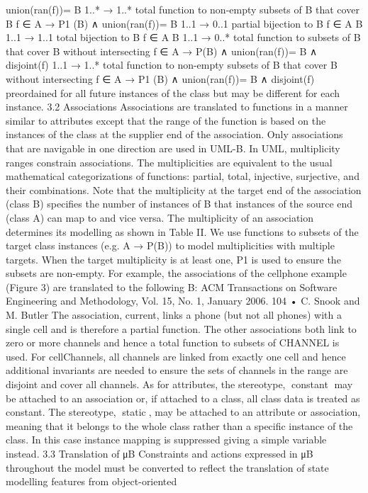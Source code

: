 union(ran(f))= B
1..* → 1..* total function to non-empty subsets of B
that cover B
f ∈ A → P1 (B) ∧
union(ran(f))= B
1..1 → 0..1 partial bijection to B f ∈ A  B
1..1 → 1..1 total bijection to B f ∈ A  B
1..1 → 0..* total function to subsets of B that cover B
without intersecting
f ∈ A → P(B) ∧
union(ran(f))= B ∧
disjoint(f)
1..1 → 1..* total function to non-empty subsets of B
that cover B without intersecting
f ∈ A → P1 (B) ∧
union(ran(f))= B ∧
disjoint(f)
preordained for all future instances of the class but may be different for each
instance.
3.2 Associations
Associations are translated to functions in a manner similar to attributes except that the range of the function is based on the instances of the class at the
supplier end of the association. Only associations that are navigable in one direction are used in UML-B. In UML, multiplicity ranges constrain associations.
The multiplicities are equivalent to the usual mathematical categorizations of
functions: partial, total, injective, surjective, and their combinations. Note that
the multiplicity at the target end of the association (class B) specifies the number of instances of B that instances of the source end (class A) can map to
and vice versa. The multiplicity of an association determines its modelling as
shown in Table II. We use functions to subsets of the target class instances
(e.g. A → P(B)) to model multiplicities with multiple targets. When the target
multiplicity is at least one, P1 is used to ensure the subsets are non-empty.
For example, the associations of the cellphone example (Figure 3) are translated to the following B:
ACM Transactions on Software Engineering and Methodology, Vol. 15, No. 1, January 2006.
104 • C. Snook and M. Butler
The association, current, links a phone (but not all phones) with a single cell
and is therefore a partial function. The other associations both link to zero or
more channels and hence a total function to subsets of CHANNEL is used. For
cellChannels, all channels are linked from exactly one cell and hence additional
invariants are needed to ensure the sets of channels in the range are disjoint
and cover all channels.
As for attributes, the stereotype, constant may be attached to an association or, if attached to a class, all class data is treated as constant. The
stereotype, static, may be attached to an attribute or association, meaning that it belongs to the whole class rather than a specific instance of the
class. In this case instance mapping is suppressed giving a simple variable
instead.
3.3 Translation of μB
Constraints and actions expressed in μB throughout the model must be converted to reflect the translation of state modelling features from object-oriented
